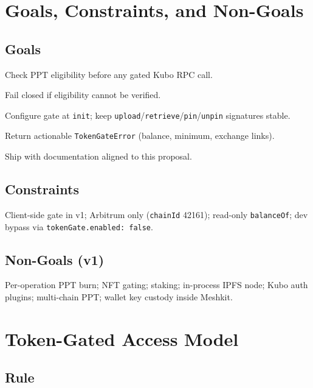 \documentclass[11pt,a4paper,openany]{report}
\begin{document}
\chapter{Goals, Constraints, and Non-Goals}

\section{Goals}

\begin{description}[style=nextline, leftmargin=2.2cm]
  \item[G1] Check PPT eligibility before any gated Kubo RPC call.
  \item[G2] Fail closed if eligibility cannot be verified.
  \item[G3] Configure gate at \texttt{init}; keep \texttt{upload}/\texttt{retrieve}/\texttt{pin}/\texttt{unpin} signatures stable.
  \item[G4] Return actionable \texttt{TokenGateError} (balance, minimum, exchange links).
  \item[G5] Ship with documentation aligned to this proposal.
\end{description}

\section{Constraints}

Client-side gate in v1; Arbitrum only (\texttt{chainId} 42161); read-only \texttt{balanceOf}; dev bypass via \texttt{tokenGate.enabled: false}.

\section{Non-Goals (v1)}

Per-operation PPT burn; NFT gating; staking; in-process IPFS node; Kubo auth plugins; multi-chain PPT; wallet key custody inside Meshkit.

\chapter{Token-Gated Access Model}

\section{Rule}
\end{document}
